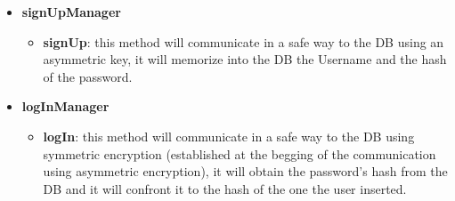 \documentclass[12pt,a4paper]{report}
\begin{document}
\begin{itemize}
\begin{itemize}
						\end{itemize}
						\item \textbf{signUpManager}
						\begin{itemize}
							\item \textbf{signUp}: this method will communicate in a safe way to the DB using an
								asymmetric key, it will memorize into the DB the Username and the hash of the
								password.
						\end{itemize}
						\item \textbf{logInManager}
						\begin{itemize}
							\item \textbf{logIn}: this method will communicate in a safe way to the DB using
								symmetric encryption (established at the begging of the communication using
								asymmetric encryption), it will obtain the password's hash from the DB and it will
								confront it to the hash of the one the user inserted.
						\end{itemize}
					\end{itemize}
\end{document}
